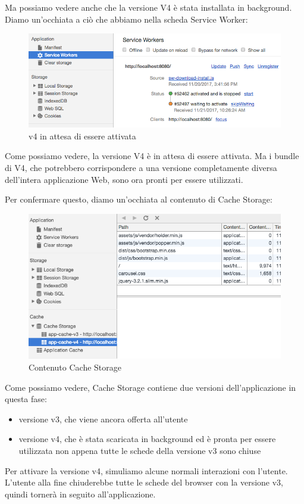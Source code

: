 \documentclass[italian]{article}
\begin{document}
Ma possiamo vedere anche che la versione V4 è stata installata in background. Diamo un'occhiata a ciò che abbiamo nella scheda Service Worker:
\begin{figure}
	\centering
	\includegraphics[width=1\linewidth]{v41}
	\caption{v4 in attesa di essere attivata}
	\label{fig:v4 in attesa di essere attivata}
\end{figure}
Come possiamo vedere, la versione V4 è in attesa di essere attivata. Ma i bundle di V4, che potrebbero corrispondere a una versione completamente diversa dell'intera applicazione Web, sono ora pronti per essere utilizzati.

Per confermare questo, diamo un'occhiata al contenuto di Cache Storage:
\begin{figure}
	\centering
	\includegraphics[width=1\linewidth]{v42}
	\caption{Contenuto Cache Storage}
	\label{fig:Contenuto Cache Storage}
\end{figure}
Come possiamo vedere, Cache Storage contiene due versioni dell'applicazione in questa fase:
\begin{itemize}
\item versione v3, che viene ancora offerta all'utente
\item versione v4, che è stata scaricata in background ed è pronta per essere utilizzata non appena tutte le schede della versione v3 sono chiuse
\end{itemize}
Per attivare la versione v4, simuliamo alcune normali interazioni con l'utente. L'utente alla fine chiuderebbe tutte le schede del browser con la versione v3, quindi tornerà in seguito all'applicazione.
\end{document}
